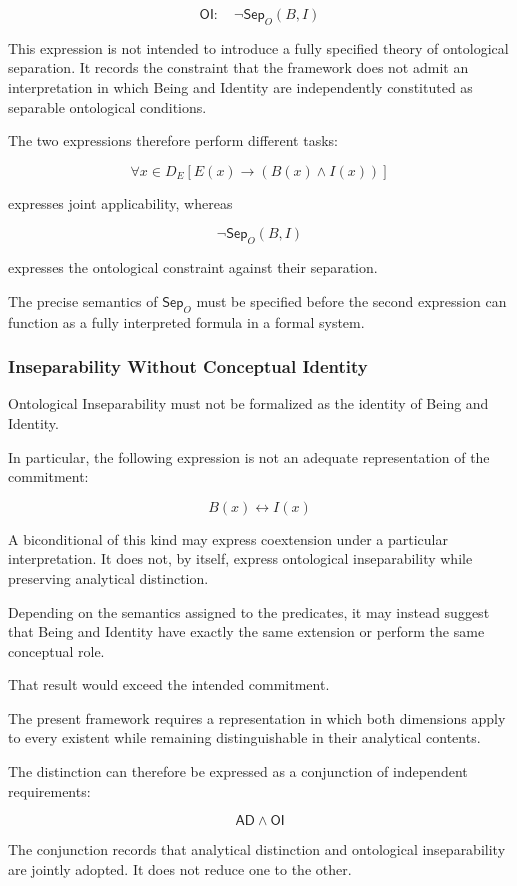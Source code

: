 \[
\mathsf{OI}:
\quad
\neg \mathsf{Sep}_O(B,I)
\]

This expression is not intended to introduce
a fully specified theory of ontological separation.
It records the constraint that the framework
does not admit an interpretation in which
Being and Identity are independently constituted
as separable ontological conditions.

The two expressions therefore perform different
tasks:

\[
\forall x \in D_E
\left[
E(x)\rightarrow(B(x)\land I(x))
\right]
\]

expresses joint applicability, whereas

\[
\neg \mathsf{Sep}_O(B,I)
\]

expresses the ontological constraint against
their separation.

The precise semantics of \(\mathsf{Sep}_O\)
must be specified before the second expression
can function as a fully interpreted formula
in a formal system.

\subsubsection{Inseparability Without Conceptual Identity}

Ontological Inseparability must not be formalized
as the identity of Being and Identity.

In particular, the following expression is
not an adequate representation of the commitment:

\[
B(x) \leftrightarrow I(x)
\]

A biconditional of this kind may express
coextension under a particular interpretation.
It does not, by itself, express ontological
inseparability while preserving analytical
distinction.

Depending on the semantics assigned to the
predicates, it may instead suggest that
Being and Identity have exactly the same
extension or perform the same conceptual role.

That result would exceed the intended commitment.

The present framework requires a representation
in which both dimensions apply to every
existent while remaining distinguishable
in their analytical contents.

The distinction can therefore be expressed
as a conjunction of independent requirements:

\[
\mathsf{AD}
\land
\mathsf{OI}
\]

The conjunction records that analytical
distinction and ontological inseparability
are jointly adopted. It does not reduce
one to the other.

